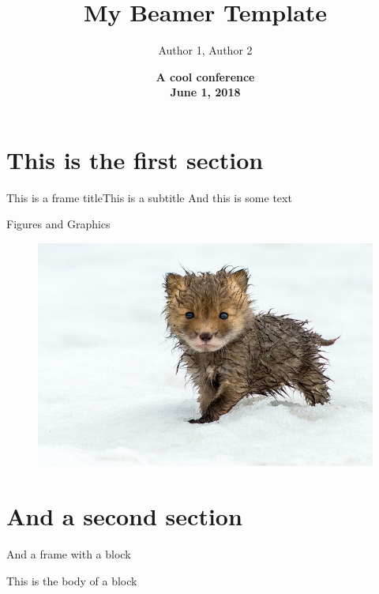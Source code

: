 \documentclass[xcolor=svgnames, 10pt, serif, aspectratio=169]{beamer}
\title{ \color{myblue} \bfseries \LARGE My Beamer Template}
\date{\vfill \color{myblue} \bfseries A cool conference \\[4pt] June 1, 2018}
\author[shortname]{
                   Author 1\inst{1},
                   Author 2\inst{2}
                }
\institute[shortinst]{
                      \inst{1} University 1 \\ 
                      \inst{2} University 2 
                     }
\begin{document}

\section{This is the first section} 


\begin{frame}{This is a frame title}{This is a subtitle}
    And this is some text
\end{frame}


\begin{frame}{Figures and Graphics}
    \begin{figure}
        \centering
        \includegraphics[scale=0.3]{fox}
    \end{figure}
\end{frame}


\section{And a second section}


\begin{frame}{And a frame with a block}

    \begin{tcolorbox}[title=This is the title of a block]
    This is the body of a block 
    \end{tcolorbox}

\end{frame}
\end{document}
